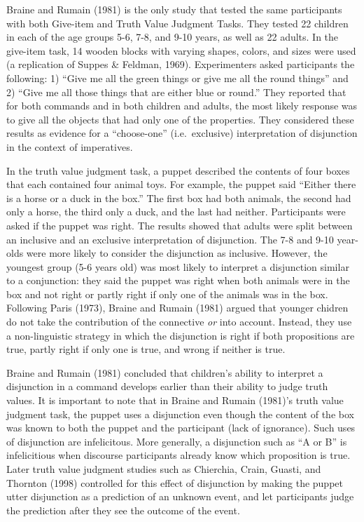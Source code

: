 \documentclass[floatsintext,man]{apa6}
\theoremstyle{definition}
\theoremstyle{definition}
\theoremstyle{definition}
\theoremstyle{remark}
\begin{document}
Braine and Rumain (1981) is the only study that tested the same
participants with both Give-item and Truth Value Judgment Tasks. They
tested 22 children in each of the age groups 5-6, 7-8, and 9-10 years,
as well as 22 adults. In the give-item task, 14 wooden blocks with
varying shapes, colors, and sizes were used (a replication of Suppes \&
Feldman, 1969). Experimenters asked participants the following: 1)
\enquote{Give me all the green things or give me all the round things}
and 2) \enquote{Give me all those things that are either blue or round.}
They reported that for both commands and in both children and adults,
the most likely response was to give all the objects that had only one
of the properties. They considered these results as evidence for a
\enquote{choose-one} (i.e.~exclusive) interpretation of disjunction in
the context of imperatives.

In the truth value judgment task, a puppet described the contents of
four boxes that each contained four animal toys. For example, the puppet
said \enquote{Either there is a horse or a duck in the box.} The first
box had both animals, the second had only a horse, the third only a
duck, and the last had neither. Participants were asked if the puppet
was right. The results showed that adults were split between an
inclusive and an exclusive interpretation of disjunction. The 7-8 and
9-10 year-olds were more likely to consider the disjunction as
inclusive. However, the youngest group (5-6 years old) was most likely
to interpret a disjunction similar to a conjunction: they said the
puppet was right when both animals were in the box and not right or
partly right if only one of the animals was in the box. Following Paris
(1973), Braine and Rumain (1981) argued that younger chidren do not take
the contribution of the connective \emph{or} into account. Instead, they
use a non-linguistic strategy in which the disjunction is right if both
propositions are true, partly right if only one is true, and wrong if
neither is true.

Braine and Rumain (1981) concluded that children's ability to interpret
a disjunction in a command develops earlier than their ability to judge
truth values. It is important to note that in Braine and Rumain (1981)'s
truth value judgment task, the puppet uses a disjunction even though the
content of the box was known to both the puppet and the participant
(lack of ignorance). Such uses of disjunction are infelicitous. More
generally, a disjunction such as \enquote{A or B} is infelicitious when
discourse participants already know which proposition is true. Later
truth value judgment studies such as Chierchia, Crain, Guasti, and
Thornton (1998) controlled for this effect of disjunction by making the
puppet utter disjunction as a prediction of an unknown event, and let
participants judge the prediction after they see the outcome of the
event.
\end{document}
